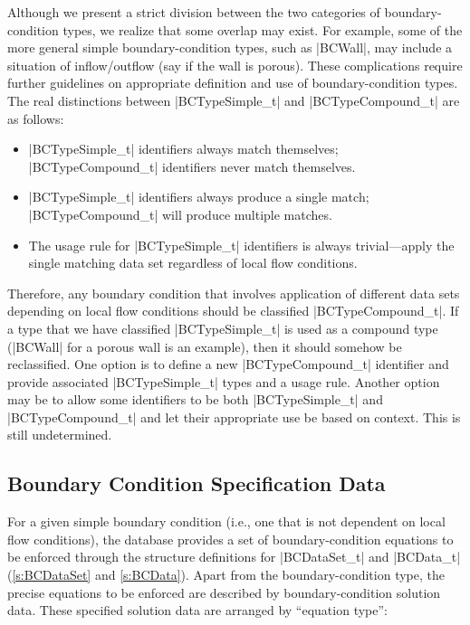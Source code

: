 Although we present a strict division between the two categories of
boundary-condition types, we realize that some overlap may exist.
For example, some of the more general simple boundary-condition types,
such as |BCWall|, may include a situation of inflow/outflow (say if the
wall is porous).  These complications require further guidelines on
appropriate definition and use of boundary-condition types.  The real
distinctions between |BCTypeSimple_t| and |BCTypeCompound_t| are as
follows:
\begin{itemize}
\item |BCTypeSimple_t| identifiers always match themselves;
      |BCTypeCompound_t| identifiers never match themselves.
\item |BCTypeSimple_t| identifiers always produce a single match; 
      |BCTypeCompound_t| will produce multiple matches.
\item The usage rule for |BCTypeSimple_t| identifiers is always
      trivial---apply the single matching data set regardless of local
      flow conditions.
\end{itemize}
Therefore, any boundary condition that involves application of different
data sets depending on local flow conditions should be classified
|BCTypeCompound_t|.  If a type that we have classified |BCTypeSimple_t|
is used as a compound type (|BCWall| for a porous wall is an example),
then it should somehow be reclassified.  One option is to define a new
|BCTypeCompound_t| identifier and provide associated |BCTypeSimple_t|
types and a usage rule.  Another option may be to allow some identifiers
to be both |BCTypeSimple_t| and |BCTypeCompound_t| and let their
appropriate use be based on context.  This is still undetermined.

\subsection{Boundary Condition Specification Data} 
\label{s:BC_specdata}

For a given simple boundary condition (i.e., one that is not
dependent on local flow conditions), the database provides a set of
boundary-condition equations to be enforced through the structure
definitions for |BCDataSet_t| and |BCData_t| (\autoref{s:BCDataSet}
and \autoref{s:BCData}).  Apart from the boundary-condition type, the
precise equations to be enforced are described by boundary-condition
solution data.  These specified solution data are arranged by ``equation
type'':

